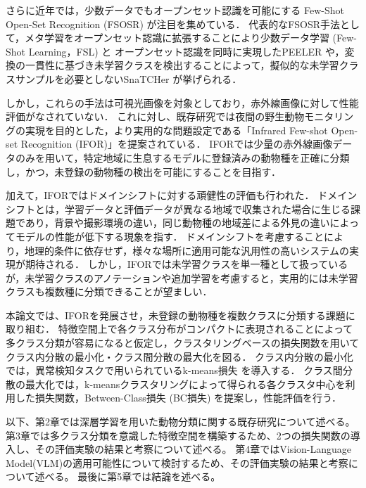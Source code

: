 \documentclass[a4paper,11pt,nomag]{jsreport}
\begin{document}
さらに近年では，少数データでもオープンセット認識を可能にする Few-Shot Open-Set Recognition (FSOSR) \cite{peeler} が注目を集めている．
代表的なFSOSR手法として，メタ学習をオープンセット認識に拡張することにより少数データ学習 (Few-Shot Learning，FSL) と オープンセット認識を同時に実現したPEELER \cite{peeler}や，変換の一貫性に基づき未学習クラスを検出することによって，擬似的な未学習クラスサンプルを必要としないSnaTCHer \cite{snatcher}が挙げられる．

しかし，これらの手法は可視光画像を対象としており，赤外線画像に対して性能評価がなされていない．
これに対し、既存研究では夜間の野生動物モニタリングの実現を目的とした，より実用的な問題設定である「Infrared Few-shot Open-set Recognition (IFOR)」を提案されている．
IFORでは少量の赤外線画像データのみを用いて，特定地域に生息するモデルに登録済みの動物種を正確に分類し，かつ，未登録の動物種の検出を可能にすることを目指す．

加えて，IFORではドメインシフトに対する頑健性の評価も行われた．
ドメインシフトとは，学習データと評価データが異なる地域で収集された場合に生じる課題であり，背景や撮影環境の違い，同じ動物種の地域差による外見の違いによってモデルの性能が低下する現象を指す．
ドメインシフトを考慮することにより，地理的条件に依存せず，様々な場所に適用可能な汎用性の高いシステムの実現が期待される．
しかし，IFORでは未学習クラスを単一種として扱っているが，未学習クラスのアノテーションや追加学習を考慮すると，実用的には未学習クラスも複数種に分類できることが望ましい．

本論文では、IFORを発展させ，未登録の動物種を複数クラスに分類する課題に取り組む．
特徴空間上で各クラス分布がコンパクトに表現されることによって多クラス分類が容易になると仮定し，クラスタリングベースの損失関数を用いてクラス内分散の最小化・クラス間分散の最大化を図る．
クラス内分散の最小化では，異常検知タスクで用いられているk-means損失 \cite{k-means} を導入する．
クラス間分散の最大化では，k-meansクラスタリングによって得られる各クラスタ中心を利用した損失関数，Between-Class損失 (BC損失) を提案し，性能評価を行う．

以下、第2章では深層学習を用いた動物分類に関する既存研究について述べる。
第3章では多クラス分類を意識した特徴空間を構築するため、2つの損失関数の導入し、その評価実験の結果と考察について述べる。
第4章ではVision-Language Model(VLM)の適用可能性について検討するため、その評価実験の結果と考察について述べる。
最後に第5章では結論を述べる。


% 
% 


\end{document}
